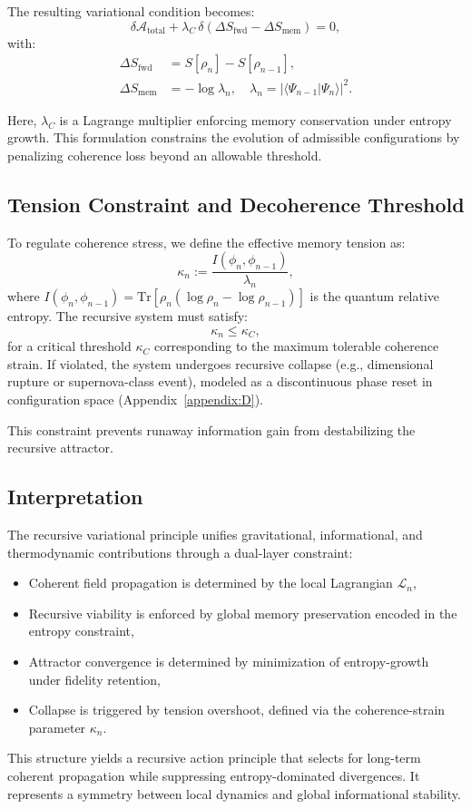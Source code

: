 The resulting variational condition becomes:
\begin{equation}
\delta \mathcal{A}_{\text{total}} + \lambda_C \, \delta\left( \Delta S_{\text{fwd}} - \Delta S_{\text{mem}} \right) = 0,
\end{equation}
with:
\begin{align*}
\Delta S_{\text{fwd}} &= S[\rho_n] - S[\rho_{n-1}], \\
\Delta S_{\text{mem}} &= -\log \lambda_n, \quad \lambda_n = |\langle \Psi_{n-1} | \Psi_n \rangle|^2.
\end{align*}

Here, \( \lambda_C \) is a Lagrange multiplier enforcing memory conservation under entropy growth. This formulation constrains the evolution of admissible configurations by penalizing coherence loss beyond an allowable threshold.

\subsection{Tension Constraint and Decoherence Threshold}

To regulate coherence stress, we define the effective memory tension as:
\begin{equation}
\kappa_n := \frac{I(\phi_n, \phi_{n-1})}{\lambda_n},
\end{equation}
where \( I(\phi_n, \phi_{n-1}) = \mathrm{Tr}[\rho_n (\log \rho_n - \log \rho_{n-1})] \) is the quantum relative entropy. The recursive system must satisfy:
\begin{equation}
\kappa_n \leq \kappa_C,
\end{equation}
for a critical threshold \( \kappa_C \) corresponding to the maximum tolerable coherence strain. If violated, the system undergoes recursive collapse (e.g., dimensional rupture or supernova-class event), modeled as a discontinuous phase reset in configuration space (Appendix~\ref{appendix:D}).

This constraint prevents runaway information gain from destabilizing the recursive attractor.

\subsection{Interpretation}

The recursive variational principle unifies gravitational, informational, and thermodynamic contributions through a dual-layer constraint:

\begin{itemize}
    \item Coherent field propagation is determined by the local Lagrangian \( \mathcal{L}_n \),
    \item Recursive viability is enforced by global memory preservation encoded in the entropy constraint,
    \item Attractor convergence is determined by minimization of entropy-growth under fidelity retention,
    \item Collapse is triggered by tension overshoot, defined via the coherence-strain parameter \( \kappa_n \).
\end{itemize}

This structure yields a recursive action principle that selects for long-term coherent propagation while suppressing entropy-dominated divergences. It represents a symmetry between local dynamics and global informational stability.

